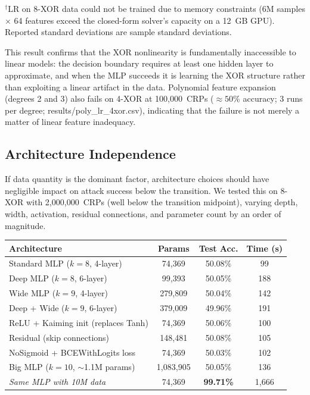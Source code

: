 \parbox{0.9\columnwidth}{\footnotesize $^\dagger$LR on 8-XOR data could
not be trained due to memory constraints (6M samples $\times$ 64 features
exceed the closed-form solver's capacity on a 12~GB GPU).  Reported standard
deviations are sample standard deviations.}
\tablefloatend

This result confirms that the XOR nonlinearity is fundamentally inaccessible
to linear models: the decision boundary requires at least one hidden layer to
approximate, and when the MLP succeeds it is learning the XOR structure rather
than exploiting a linear artifact in the data.  Polynomial feature expansion
(degrees 2 and 3) also fails on 4-XOR at 100{,}000~CRPs ($\approx 50\%$
accuracy; 3 runs per degree; results/poly\_lr\_4xor.csv), indicating that the
failure is not merely a matter of linear feature inadequacy.

\subsection{Architecture Independence}
\label{sec:arch_independence}

If data quantity is the dominant factor, architecture choices should have
negligible impact on attack success below the transition.  We tested this on
8-XOR with 2{,}000{,}000~CRPs (well below the transition midpoint), varying
depth, width, activation, residual connections, and parameter count by an
order of magnitude.

\tablefloatbegin
\centering
\caption{Architecture independence experiment.  All models were trained on
8-XOR with 2{,}000{,}000~CRPs (below transition).  None exceed 51\% test
accuracy, despite parameter counts varying by $15\times$.  Data sources:
\texttt{8xor\_v2\_results.csv} (lines~2--9),
\texttt{8xor\_attack\_results.csv} (S3/S4/S5), and
\texttt{phase4\_results.csv} (line~14).}
\label{tab:arch}
\begin{tabular}{lccc}
\toprule
Architecture & Params & Test Acc. & Time (s) \\
\midrule
Standard MLP ($k{=}8$, 4-layer)       & 74{,}369 & 50.08\% & 99 \\
Deep MLP ($k{=}8$, 6-layer)           & 99{,}393 & 50.05\% & 188 \\
Wide MLP ($k{=}9$, 4-layer)           & 279{,}809 & 50.04\% & 142 \\
Deep + Wide ($k{=}9$, 6-layer)        & 379{,}009 & 49.96\% & 191 \\
ReLU + Kaiming init (replaces Tanh)   & 74{,}369 & 50.06\% & 100 \\
Residual (skip connections)            & 148{,}481 & 50.08\% & 105 \\
NoSigmoid + BCEWithLogits loss        & 74{,}369 & 50.03\% & 102 \\
Big MLP ($k{=}10$, $\sim$1.1M params) & 1{,}083{,}905 & 50.05\% & 136 \\
\midrule
\emph{Same MLP with 10M data}         & 74{,}369 & \textbf{99.71\%} & 1{,}666 \\
\bottomrule
\end{tabular}
\tablefloatend

